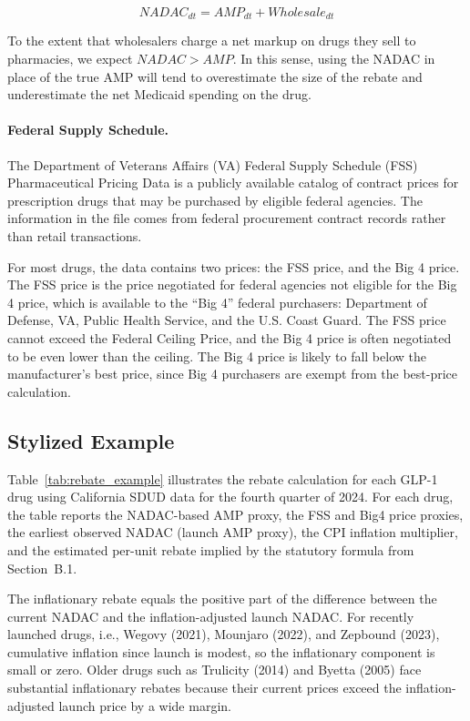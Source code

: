 \[
NADAC_{dt} = AMP_{dt} + Wholesale_{dt}
\]

To the extent that wholesalers charge a net markup on drugs they sell to pharmacies, we expect $NADAC > AMP$. In this sense, using the NADAC in place of the true AMP will tend to overestimate the size of the rebate and underestimate the net Medicaid spending on the drug.

\paragraph{Federal Supply Schedule.} The Department of Veterans Affairs (VA) Federal Supply Schedule (FSS) Pharmaceutical Pricing Data is a publicly available catalog of contract prices for prescription drugs that may be purchased by eligible federal agencies. The information in the file comes from federal procurement contract records rather than retail transactions.

For most drugs, the data contains two prices: the FSS price, and the Big 4 price. The FSS price is the price negotiated for federal agencies not eligible for the Big 4 price, which is available to the ``Big 4'' federal purchasers: Department of Defense, VA, Public Health Service, and the U.S. Coast Guard. The FSS price cannot exceed the Federal Ceiling Price, and the Big 4 price is often negotiated to be even lower than the ceiling. The Big 4 price is likely to fall below the manufacturer's best price, since Big 4 purchasers are exempt from the best-price calculation.

\subsection{Stylized Example}

Table~\ref{tab:rebate_example} illustrates the rebate calculation for each GLP-1 drug using California SDUD data for the fourth quarter of 2024. For each drug, the table reports the NADAC-based AMP proxy, the FSS and Big4 price proxies, the earliest observed NADAC (launch AMP proxy), the CPI inflation multiplier, and the estimated per-unit rebate implied by the statutory formula from Section~B.1.

The inflationary rebate equals the positive part of the difference between the current NADAC and the inflation-adjusted launch NADAC. For recently launched drugs, i.e., Wegovy (2021), Mounjaro (2022), and Zepbound (2023), cumulative inflation since launch is modest, so the inflationary component is small or zero. Older drugs such as Trulicity (2014) and Byetta (2005) face substantial inflationary rebates because their current prices exceed the inflation-adjusted launch price by a wide margin.

